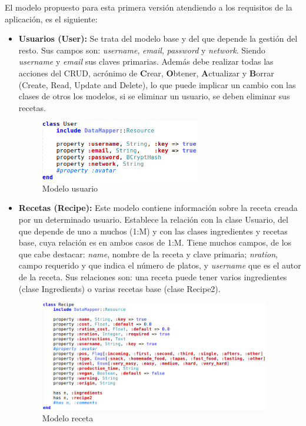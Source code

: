\vspace*{0.1in}
El modelo propuesto para esta primera versión atendiendo a los requisitos de la aplicación, es el siguiente:
\begin{itemize}
	\item \textbf{Usuarios (User):} Se trata del modelo base y del que depende la gestión del resto. Sus campos son: \emph{username}, \emph{email}, \emph{password} y \emph{network}. Siendo \emph{username} y \emph{email} sus claves primarias. Además debe realizar todas las acciones del CRUD, acrónimo de \textbf{C}rear, \textbf{O}btener, \textbf{A}ctualizar y \textbf{B}orrar (Create, Read, Update and Delete), lo que puede implicar un cambio con las clases de otros los modelos, si se eliminar un usuario, se deben eliminar sus recetas.

	\begin{figure}[H]
		\centering
		\includegraphics[width=7cm]{./images/chefmanagement-model-user.png}
		\caption{Modelo usuario} \label{fig:chefmanagement-model-user}
	\end{figure}

	\item \textbf{Recetas (Recipe):} Este modelo contiene información sobre la receta creada por un determinado usuario. Establece la relación con la clase Usuario, del que depende de uno a muchos (1:M) y con las clases ingredientes y recetas base, cuya relación es en ambos casos de 1:M. Tiene muchos campos, de los que cabe destacar: \emph{name}, nombre de la receta y clave primaria; \emph{nration}, campo requerido y que indica el número de platos, y \emph{username} que es el autor de la receta. 	Sus relaciones son: una receta puede tener varios ingredientes (clase Ingredients) o varias recetas base (clase Recipe2).

	\begin{figure}[H]
		\centering
		\includegraphics[width=10cm]{./images/chefmanagement-model-recipe.png}
		\caption{Modelo receta} \label{fig:chefmanagement-model-recipe}
	\end{figure}


\end{itemize}
